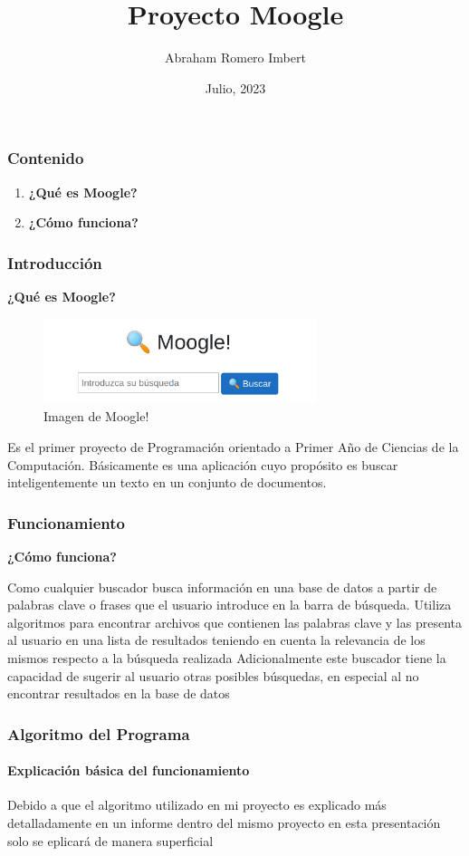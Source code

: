 \documentclass{beamer}
\title{Proyecto Moogle}
\subtitle{}
\institute{Facultad de Matemática y Computación\\Universidad de la Habana}
\author{Abraham Romero Imbert}
\date{Julio, 2023}
\begin{document}
\maketitle

\begin{frame}
  \frametitle{Contenido}
  \begin{enumerate}
    \item \Huge\textbf{¿Qué es Moogle?}
    \item  \Huge\textbf{¿Cómo funciona?}
  \end{enumerate}
\end{frame}

\begin{frame}
  \frametitle{ Introducción}
\begin{center}
  \LARGE\textbf{¿Qué es Moogle?}
\end{center}
\begin{figure}[h]
    \center
    \includegraphics[width=8cm]{moogle.png}
    \caption{Imagen de Moogle!}
    \label{fig:Moogle}
\end{figure}
Es el primer proyecto de Programación orientado a Primer Año de Ciencias de la Computación.
Básicamente es una aplicación cuyo propósito es buscar inteligentemente un texto en un conjunto de documentos.
\end{frame}

\begin{frame}
\frametitle{Funcionamiento}
\begin{center}
  \LARGE\textbf{¿Cómo funciona?}
\end{center}
Como cualquier buscador busca información en una base de datos a partir de palabras clave o frases que el usuario introduce en la barra de búsqueda.  
Utiliza algoritmos para encontrar archivos que contienen las palabras clave y las presenta al usuario en una lista de resultados teniendo en cuenta la relevancia de los mismos respecto a la búsqueda realizada
Adicionalmente este buscador tiene la capacidad de sugerir al usuario otras posibles  búsquedas, en especial al no encontrar resultados en la base de datos
\end{frame}

\begin{frame}
\frametitle{Algoritmo del Programa}
\framesubtitle{Explicación básica del funcionamiento}
Debido a que el algoritmo utilizado en mi proyecto es explicado más detalladamente en un informe dentro del mismo proyecto en esta presentación solo se eplicará de manera superficial
\end{frame}
\end{document}
